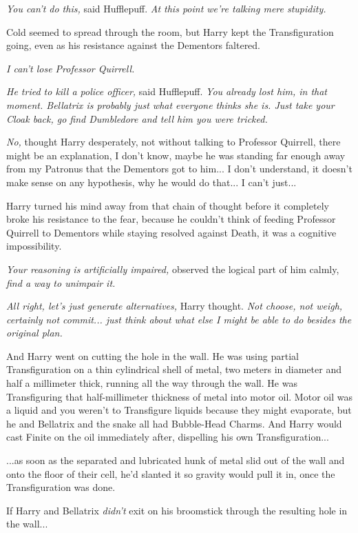 \emph{You can't do this,} said Hufflepuff. \emph{At this point we're
talking mere stupidity.}

Cold seemed to spread through the room, but Harry kept the
Transfiguration going, even as his resistance against the Dementors
faltered.

\emph{I can't lose Professor Quirrell.}

\emph{He tried to kill a police officer,} said Hufflepuff. \emph{You
already lost him, in that moment. Bellatrix is probably just what
everyone thinks she is. Just take your Cloak back, go find Dumbledore
and tell him you were tricked.}

\emph{No,} thought Harry desperately, not without talking to Professor
Quirrell, there might be an explanation, I don't know, maybe he was
standing far enough away from my Patronus that the Dementors got to
him... I don't understand, it doesn't make sense on any hypothesis,
why he would do that... I can't just...

Harry turned his mind away from that chain of thought before it
completely broke his resistance to the fear, because he couldn't think
of feeding Professor Quirrell to Dementors while staying resolved
against Death, it was a cognitive impossibility.

\emph{Your reasoning is artificially impaired,} observed the logical
part of him calmly, \emph{find a way to unimpair it.}

\emph{All right, let's just generate alternatives,} Harry thought.
\emph{Not choose, not weigh, certainly not commit... just think
about what else I might be able to do besides the original plan.}

And Harry went on cutting the hole in the wall. He was using partial
Transfiguration on a thin cylindrical shell of metal, two meters in
diameter and half a millimeter thick, running all the way through the
wall. He was Transfiguring that half-millimeter thickness of metal into
motor oil. Motor oil was a liquid and you weren't to Transfigure liquids
because they might evaporate, but he and Bellatrix and the snake all had
Bubble-Head Charms. And Harry would cast Finite on the oil immediately
after, dispelling his own Transfiguration...

...as soon as the separated and lubricated hunk of metal slid out
of the wall and onto the floor of their cell, he'd slanted it so gravity
would pull it in, once the Transfiguration was done.

If Harry and Bellatrix \emph{didn't} exit on his broomstick through the
resulting hole in the wall...

